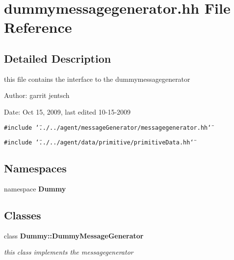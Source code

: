\section{dummymessagegenerator.hh File Reference}
\label{dummymessagegenerator_8hh}


\subsection{Detailed Description}
this file contains the interface to the dummymessagegenerator

\begin{Desc}
\item[Author:]garrit jentsch\end{Desc}
\begin{Desc}
\item[Date:]Oct 15, 2009, last edited 10-15-2009 \end{Desc}


{\tt \#include \char`\"{}../../agent/messageGenerator/messagegenerator.hh\char`\"{}}\par
{\tt \#include \char`\"{}../../agent/data/primitive/primitiveData.hh\char`\"{}}\par
\subsection*{Namespaces}
\begin{CompactItemize}
\item 
namespace {\bf Dummy}
\end{CompactItemize}
\subsection*{Classes}
\begin{CompactItemize}
\item 
class {\bf Dummy::DummyMessageGenerator}
\begin{CompactList}\small\item\em this class implements the messagegenerator \item\end{CompactList}\end{CompactItemize}
